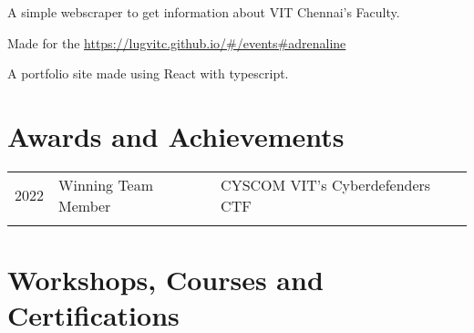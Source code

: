 \documentclass[]{plushcv}
\begin{document}
\begin{minipage}[t]{0.70\textwidth}
    \begin{tightemize}
        \item A simple webscraper to get information about VIT Chennai's Faculty.
        \item Made for the \href{Adrenalin/FOSS Day event}{https://lugvitc.github.io/\#/events\#adrenaline}
    \end{tightemize}
    \sectionsep

    \begin{tightemize}
        \item A portfolio site made using React with typescript.
    \end{tightemize}
    \sectionsep


    \section{Awards and Achievements}
    \begin{tabular}{rll}
        2022 & Winning Team Member & CYSCOM VIT's Cyberdefenders CTF \\
        \\
    \end{tabular}
    \sectionsep


    \section{Workshops, Courses and Certifications}
    \sectionsep

    \sectionsep

    \sectionsep


\end{minipage}
\end{document}
